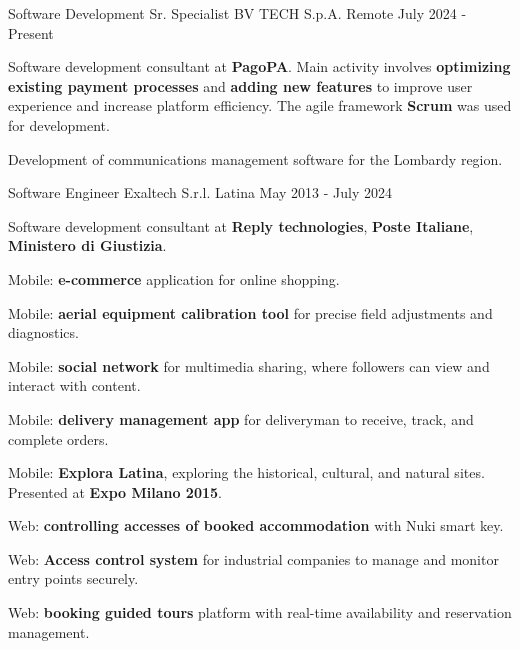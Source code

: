 

\begin{cventries}

  \cventry
    {Software Development Sr. Specialist} %
    {BV TECH S.p.A.} %
    {Remote} %
    {July 2024 - Present} %
    {
      \begin{cvitems} %
        \item {Software development consultant at \textbf{PagoPA}. Main activity involves \textbf{optimizing existing payment processes} and \textbf{adding new features} to improve user experience and increase platform efficiency. The agile framework \textbf{Scrum} was used for development.}
        \item {Development of communications management software for the Lombardy region.}  
      \end{cvitems}
    }

  \cventry
    {Software Engineer} %
    {Exaltech S.r.l.} %
    {Latina} %
    {May 2013 - July 2024} %
    {
      \begin{cvitems} %
        \item {Software development consultant at \textbf{Reply technologies}, \textbf{Poste Italiane}, \textbf{Ministero di Giustizia}.}
        \item {Mobile: \textbf{e-commerce} application for online shopping.}
        \item {Mobile: \textbf{aerial equipment calibration tool} for precise field adjustments and diagnostics.}
        \item {Mobile: \textbf{social network} for multimedia sharing, where followers can view and interact with content.}
        \item {Mobile: \textbf{delivery management app} for deliveryman to receive, track, and complete orders.}
        \item {Mobile: \textbf{Explora Latina}, exploring the historical, cultural, and natural sites. Presented at \textbf{Expo Milano 2015}.}
        \item {Web: \textbf{controlling accesses of booked accommodation} with Nuki smart key.}
        \item {Web: \textbf{Access control system} for industrial companies to manage and monitor entry points securely.}
        \item {Web: \textbf{booking guided tours} platform with real-time availability and reservation management.}
      \end{cvitems}
    }

\end{cventries}
